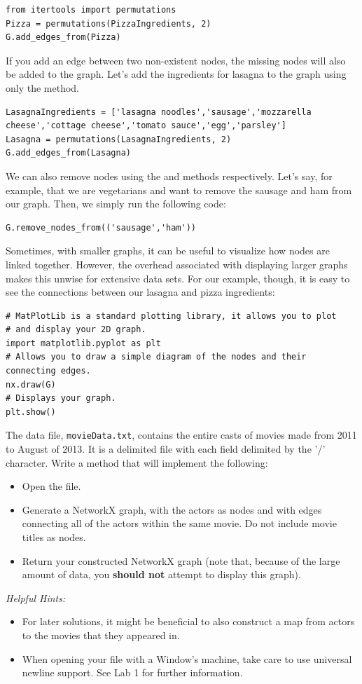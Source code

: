 \begin{lstlisting}
from itertools import permutations
Pizza = permutations(PizzaIngredients, 2)
G.add_edges_from(Pizza)
\end{lstlisting}
If you add an edge between two non-existent nodes, the missing nodes will also be added to the graph. Let's add the ingredients for lasagna to the graph using only the  method.
\begin{lstlisting}
LasagnaIngredients = ['lasagna noodles','sausage','mozzarella cheese','cottage cheese','tomato sauce','egg','parsley']
Lasagna = permutations(LasagnaIngredients, 2)
G.add_edges_from(Lasagna)
\end{lstlisting}
We can also remove nodes using the  and  methods respectively. Let's say, for example, that we are vegetarians and want to remove the sausage and ham from our graph. Then, we simply run the following code:
\begin{lstlisting}
G.remove_nodes_from(('sausage','ham'))
\end{lstlisting}

Sometimes, with smaller graphs, it can be useful to visualize how nodes are linked together. However, the overhead associated with displaying larger graphs makes this unwise for extensive data sets.
For our example, though, it is easy to see the connections between our lasagna and pizza ingredients:

\begin{lstlisting}
# MatPlotLib is a standard plotting library, it allows you to plot
# and display your 2D graph.
import matplotlib.pyplot as plt
# Allows you to draw a simple diagram of the nodes and their connecting edges.
nx.draw(G)
# Displays your graph.
plt.show()
\end{lstlisting}


\begin{problem}
The data file, \texttt{movieData.txt}, contains the entire casts of movies made from 2011 to August of 2013. It is a delimited file with each field delimited by the '/' character. Write a method that will implement the following:
\begin{itemize}
\item Open the file.
\item Generate a NetworkX graph, with the actors as nodes and with edges connecting all of the actors within the same movie. Do not include movie titles as nodes.
\item Return your constructed NetworkX graph (note that, because of the large amount of data, you \textbf{should not} attempt to display this graph).
\end{itemize}
\emph{Helpful Hints:}
\begin{itemize}
\item For later solutions, it might be beneficial to also construct a map from actors to the movies that they appeared in.
\item When opening your file with a Window's machine, take care to use universal newline support. See Lab 1 for further information.
\end{itemize}
\end{problem}

